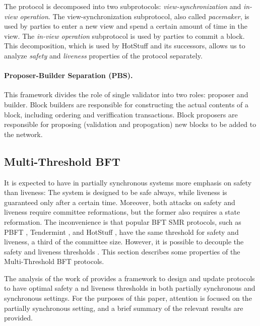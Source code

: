 The protocol is decomposed into two subprotocols:
  \emph{view-synchronization} and \emph{in-view operation}. 
The view-synchronization subprotocol, also called \emph{pacemaker},
 is used by parties to enter a new view 
 and spend a certain amount of time in the view.
The \emph{in-view operation} subprotocol is used by parties to commit a block.
This decomposition, which is used by HotStuff \cite{HotStuff} and its successors, 
 allows us to analyze \emph{safety} and \emph{liveness} properties of the protocol separately.

\paragraph{Proposer-Builder Separation (PBS).}
 This framework divides the role of single validator into two roles: proposer and builder. 
 Block builders are responsible for constructing the actual contents of a block, including 
 ordering and veriffication transactions. Block proposers are responsible for proposing 
 (validation and propogation) new blocks to be added to the network. 

 \subsection{Multi-Threshold BFT}
 \label{section:preliminaries:multi-threshold-bft}
 
 It is expected to have in partially synchronous systems more emphasis on safety than liveness:
 The system is designed to be safe always, while liveness is guaranteed only after a certain time.
 Moreover, both attacks on safety and liveness require committee reformations, but the former also requires a state reformation.
 The inconvenience is that popular BFT SMR protocols, such as PBFT \cite{PBFT}, Tendermint \cite{Tendermint}, and HotStuff \cite{HotStuff},
 have the same threshold for safety and liveness, a third of the committee size.
 However, it is possible to decouple the safety and liveness thresholds \cite{MultiThresholdBFT}.
This section describes some properties of the Multi-Threshold BFT protocols.
   
 The analysis of the work of \cite{MultiThresholdBFT} provides a framework 
  to design and update protocols to have optimal safety a
  nd liveness thresholds in both partially synchronous and synchronous settings. 
For the purposes of this paper, attention is focused on the partially synchronous setting, 
and a brief summary of the relevant results are provided.
 
